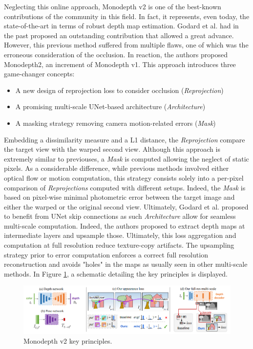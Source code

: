 Neglecting this online approach, Monodepth v2 \cite{godard2019digging} is one of the best-known contributions of the community in this field. In fact, it represents, even today, the state-of-the-art in terms of robust depth map estimation. Godard et al. had in the past proposed an outstanding contribution that allowed a great advance. However, this previous method suffered from multiple flaws, one of which was the erroneous consideration of the occlusion. In reaction, the authors proposed Monodepth2, an increment of Monodepth v1.
This approach introduces three game-changer concepts:
\begin{itemize}
	\item A new design of reprojection loss to consider occlusion (\textit{Reprojection})
	\item A promising multi-scale UNet-based architecture  (\textit{Architecture})
	\item A masking strategy removing camera motion-related errors (\textit{Mask})
\end{itemize}

Embedding a dissimilarity measure and a L1 distance, the \textit{Reprojection} compare the target view with the warped second view. Although this approach is extremely similar to previouses, a \textit{Mask} is computed allowing the neglect of static pixels. As a considerable difference, while previous methods involved either optical flow or motion computation, this strategy consists solely into a per-pixel comparison of \textit{Reprojections} computed with different setups. Indeed, the \textit{Mask} is based on pixel-wise minimal photometric error between the target image and either the warped or the original second view.
Ultimately, Godard et al. proposed to benefit from UNet \cite{ronneberger2015u} skip connections as such \textit{Architecture} allow for seamless multi-scale computation. Indeed, the authors proposed to extract depth maps at intermediate layers and upsample those. Ultimately, this loss aggregation and computation at full resolution reduce texture-copy artifacts. The upsampling strategy prior to error computation enforces a correct full resolution reconstruction and avoids "holes" in the maps as usually seen in other multi-scale methods.
In Figure \ref{godardillu}, a schematic detailing the key principles is displayed.

\begin{figure}[h]
	\centering
	\includegraphics[width=0.8\linewidth]{Figures/SOA/godardillu}
	\caption[Monodepth v2 key principles.]{Monodepth v2 \cite{godard2019digging} key principles.}
	\label{godardillu}
\end{figure}

